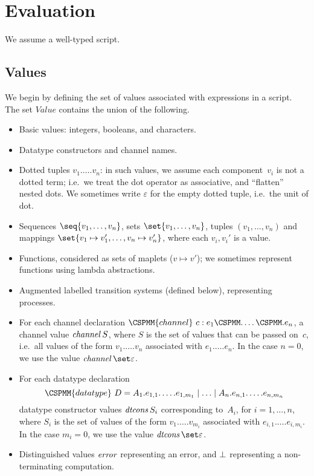 \section{Evaluation}

We assume a well-typed script.


\subsection{Values}

We begin by defining the set of values associated with expressions in a
script.  The set $Value$ contains the union of the following. 
%
\begin{itemize}
\item Basic values: integers, booleans, and characters.

\item Datatype constructors and channel names.

\item Dotted tuples $v_1.\ldots.v_n$: in such values, we assume each
  component~$v_i$ is not a dotted term; i.e.~we treat the dot operator as
  associative, and ``flatten'' nested dots.  We sometimes write $\varepsilon$
  for the empty dotted tuple, i.e.~the unit of dot.

\item Sequences $\seq{v_1,\ldots,v_n}$, sets
  $\set{v_1,\ldots,v_n}$, tuples $(v_1,\ldots,v_n)$ and mappings
  $\set{v_1 \mapsto v_1', \ldots, v_n \mapsto v_n'}$, where each $v_i, v_i'$
  is a value.

\item Functions, considered as sets of maplets ($v \mapsto v'$); we sometimes
  represent functions using lambda abstractions.

\item Augmented labelled transition systems (defined below), representing
  processes.

\item For each channel declaration $\CSPMM{channel}~c : e_1\M.\ldots\M.e_n$, a
  channel value $\mathop{\it channel} S$, where $S$ is the set of values that can be
  passed on~$c$, i.e.~all values of the form $v_1.\ldots.v_n$ associated with
  $e_1.\ldots.e_n$.  In the case $n=0$, we use the value
  $\channel \set\varepsilon$.  

\item For each datatype declaration
\[
\CSPMM{datatype}~D = 
  A_1.e_{1,1}.\ldots.e_{1,m_1} \mid \ldots \mid A_n.e_{n,1}.\ldots.e_{n,m_n}
\]
datatype constructor values $\mathop{\it dtcons} S_i$ corresponding to~$A_i$, for
$i = 1,\ldots,n$, where $S_i$ is the set of values of the form
$v_1.\ldots.v_{m_i}$ associated with $e_{i,1}.\ldots.e_{i,m_i}$.  In the case
$m_i=0$, we use the value $\dtcons\set\varepsilon$.

\item Distinguished values $\mathord{\it error}$ representing an error, and $\perp$
  representing a non-terminating computation.
\end{itemize}


